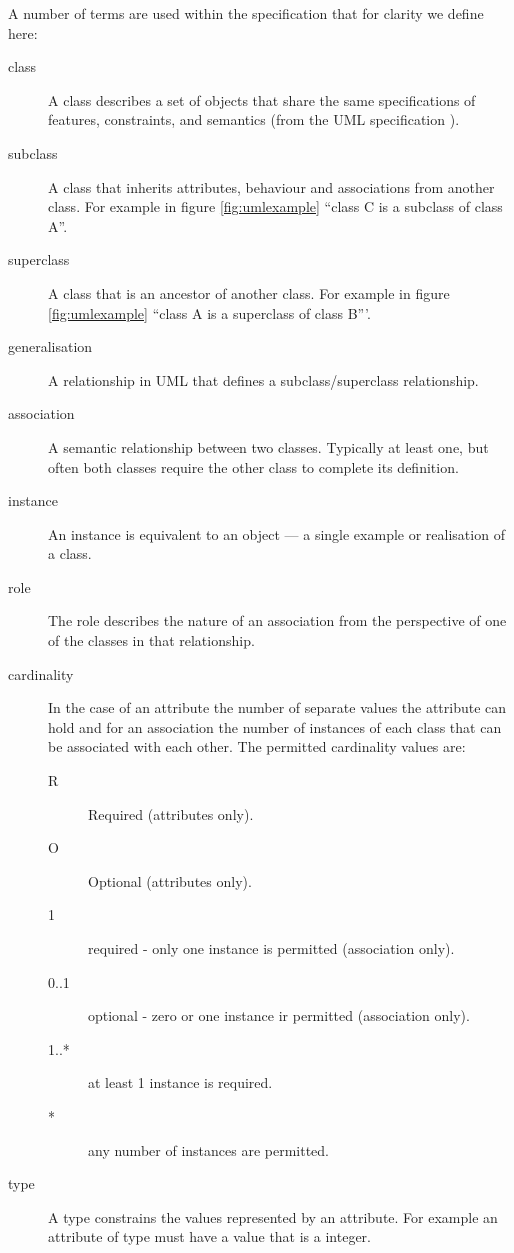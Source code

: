 A number of terms are used within the specification that
for clarity we define here:
\begin{description}
\item[class] A class describes a set of objects that share the same
  specifications of features, constraints, and semantics (from the UML
  specification \cite{umlspec}).
\item[subclass] A class that inherits attributes, behaviour and
  associations from another class. For example in figure
  \ref{fig:umlexample} ``class C is a subclass of class A''.
\item[superclass] A class that is an ancestor of another class. For
  example in figure \ref{fig:umlexample} ``class A is a superclass of class B'''.
\item[generalisation] A relationship in UML that defines a
  subclass/superclass relationship.
\item[association] A semantic relationship between two
  classes. Typically at least one, but often both classes require the
  other class to complete its definition.
\item[instance] An instance is equivalent to an object --- a single
  example or realisation of a class.
\item[role] The role describes the nature of an association from the
  perspective of one of the classes in that relationship.
\item[cardinality] In the case of an attribute the number of separate
  values the attribute can hold and for an association the number of
  instances of each class that can be associated with each other. The
  permitted cardinality values are:
  \begin{description}
  \item[R] Required (attributes only).
  \item[O] Optional (attributes only).
  \item[1] required - only one instance is permitted (association only).
  \item[0..1] optional -  zero or one instance ir permitted (association only).
  \item[1..*] at least 1 instance is required.
  \item[*] any number of instances are permitted.
  \end{description}
\item[type] A type constrains the values represented by an
  attribute. For example an attribute of type  must have a
  value that is a integer.
\end{description}


